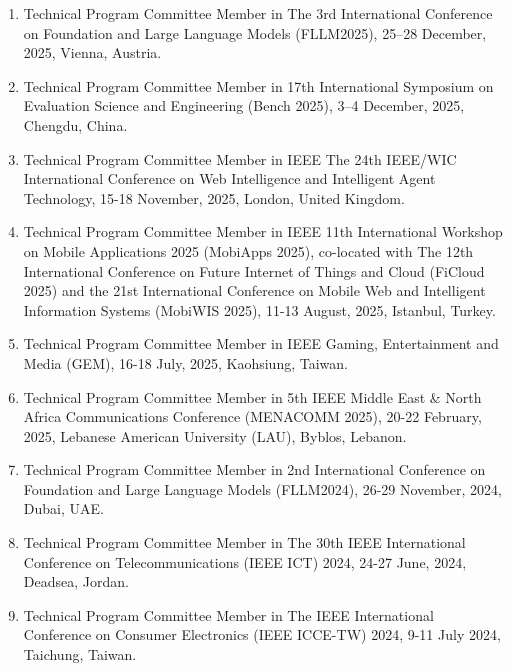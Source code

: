 \documentclass[11pt,a4paper]{moderncv}
\begin{document}
\begin{adjustwidth}{6em}{0pt}
	\begin{enumerate}
		
		\item Technical Program Committee Member in The 3rd International Conference on Foundation and Large Language Models (FLLM2025), 25–28 December, 2025, Vienna, Austria.
		
		\item Technical Program Committee Member in 17th International Symposium on Evaluation Science and Engineering (Bench 2025), 3–4 December, 2025, Chengdu, China.
		
		\item Technical Program Committee Member in IEEE The 24th IEEE/WIC International Conference on Web Intelligence and Intelligent Agent Technology, 15-18 November, 2025, London, United Kingdom.
		
		\item Technical Program Committee Member in IEEE 11th International Workshop on Mobile Applications 2025 (MobiApps 2025), co-located with The 12th International Conference on Future Internet of Things and Cloud (FiCloud 2025) and the 21st International Conference on Mobile Web and Intelligent Information Systems (MobiWIS 2025), 11-13 August, 2025, Istanbul, Turkey.
		
		\item Technical Program Committee Member in IEEE Gaming, Entertainment and Media (GEM), 16-18 July, 2025, Kaohsiung, Taiwan.
		
		\item Technical Program Committee Member in 5th IEEE Middle East \& North Africa Communications Conference (MENACOMM 2025), 20-22 February, 2025, Lebanese American University (LAU), Byblos, Lebanon.
		
		\item Technical Program Committee Member in 2nd International Conference on Foundation and Large Language Models (FLLM2024), 26-29 November, 2024, Dubai, UAE.
		
		\item Technical Program Committee Member in The 30th IEEE International Conference on Telecommunications (IEEE ICT) 2024, 24-27 June, 2024, Deadsea, Jordan.
		
		\item Technical Program Committee Member in The IEEE International Conference on Consumer Electronics (IEEE ICCE-TW) 2024, 9-11 July 2024, Taichung, Taiwan.
		

\end{enumerate}
\end{adjustwidth}
\end{document}

